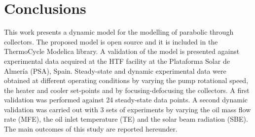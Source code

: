 \documentclass[final,3p,times,review]{elsarticle}
\begin{document}
\section{Conclusions} \label{Sec:Conclusions}
%
This work presents a dynamic model for the modelling of parabolic through collectors. The proposed model is open source and it is included in the ThermoCycle Modelica library. A validation of the model is presented against experimental data acquired at the HTF facility at the Plataforma Solar de Almer\' ia (PSA), Spain. Steady-state and dynamic experimental data were obtained at different operating conditions by varying the pump rotational speed, the heater and cooler set-points and by focusing-defocusing the collectors. A first validation was performed against 24 steady-state data points. A second dynamic validation was carried out with 3 sets of experiments by varying the oil mass flow rate (MFE), the oil inlet temperature (TE) and the solar beam radiation (SBE).
The main outcomes of this study are reported hereunder.
%
\end{document}
